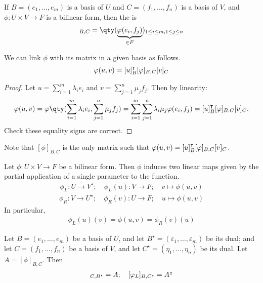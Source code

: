 \begin{definition}
	If $B = (e_1, \dots, e_m)$ is a basis of $U$ and $C = (f_1, \dots, f_n)$ is a basis of $V$, and $\phi \colon U \times V \to F$ is a bilinear form, then the  is
	\begin{align*}
		[\phi]_{B, C} = \qty( \underbrace{\phi(e_i, f_j)}_{\in F} )_{1 \leq i \leq m, 1 \leq j \leq n}
	\end{align*}
\end{definition}
\begin{lemma}
	We can link $\phi$ with its matrix in a given basis as follows.
	\begin{align*}
		\varphi(u,v) = [u]_B^\intercal [\varphi]_{B, C} [v]_C
	\end{align*}
\end{lemma}
\begin{proof}
	Let $u = \sum_{i=1}^m \lambda_i e_i$ and $v = \sum_{j=1}^n \mu_j f_j$.
	Then by linearity:
	\begin{align*}
		\phi(u,v) = \phi\qty( \sum_{i=1}^m \lambda_i e_i, \sum_{j=1}^n \mu_j f_j ) = \sum_{i=1}^m \sum_{j=1}^n \lambda_i \mu_j \phi(e_i, f_j) = [u]_B^\transpose [\phi]_{B,C} [v]_C.
	\end{align*}
	Check these equality signs are correct.
\end{proof}
\begin{remark}
	Note that $[\phi]_{B,C}$ is the only matrix such that $\varphi(u,v) = [u]_B^\intercal [\varphi]_{B, C} [v]_C$.
\end{remark}
\begin{definition}
	Let $\phi \colon U \times V \to F$ be a bilinear form.
	Then $\phi$ induces two linear maps given by the partial application of a single parameter to the function.
	\begin{align*}
		\phi_L \colon U \to V^\star;\quad \phi_L(u) \colon V \to F;\quad v \mapsto \phi(u,v)
	\end{align*}
	\begin{align*}
		\phi_R \colon V \to U^\star;\quad \phi_R(v) \colon U \to F;\quad u \mapsto \phi(u,v)
	\end{align*}
	In particular,
	\begin{align*}
		\phi_L(u)(v) = \phi(u,v) = \phi_R(v)(u)
	\end{align*}
\end{definition}
\begin{lemma}
	Let $B = (e_1, \dots, e_m)$ be a basis of $U$, and let $B^\star = (\varepsilon_1, \dots, \varepsilon_m)$ be its dual; and let $C = (f_1, \dots, f_n)$ be a basis of $V$, and let $C^\star = (\eta_1, \dots, \eta_n)$ be its dual.
	Let $A = [\phi]_{B,C}$.
	Then
	\begin{align*}
		[\phi_R]_{C, B^\star} = A;\quad [\phi_L]_{B, C^\star} = A^\transpose
	\end{align*}
\end{lemma}
